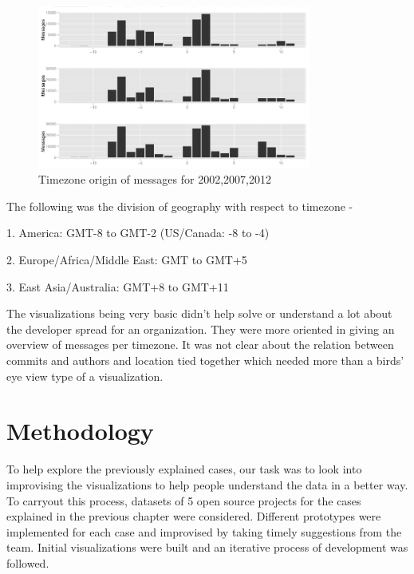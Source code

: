 \documentclass[seploa]{beavtex}
\begin{document}
\begin{figure}[!ht]
\centering
\includegraphics[width=90mm]{work2.png}
\caption{Timezone origin of messages for 2002,2007,2012}
\end{figure}

The following was the division of geography with respect to timezone -

1. America: GMT-8 to GMT-2 (US/Canada: -8 to -4)

2. Europe/Africa/Middle East: GMT to GMT+5

3. East Asia/Australia: GMT+8 to GMT+11


The visualizations being very basic didn't help solve or understand a lot about the developer spread for an organization. They were more oriented in giving an overview of messages per timezone. It was not clear about the relation between commits and authors and location tied together which needed more than a birds' eye view type of a visualization. 


\chapter{Methodology}
To help explore the previously explained cases, our task was to look into improvising the visualizations to help people understand the data in a better way. To carryout this process, datasets of 5 open source projects for the cases explained in the previous chapter were considered. Different prototypes were implemented for each case and improvised by taking timely suggestions from the team. Initial visualizations were built and an iterative process of development was followed.
\end{document}
